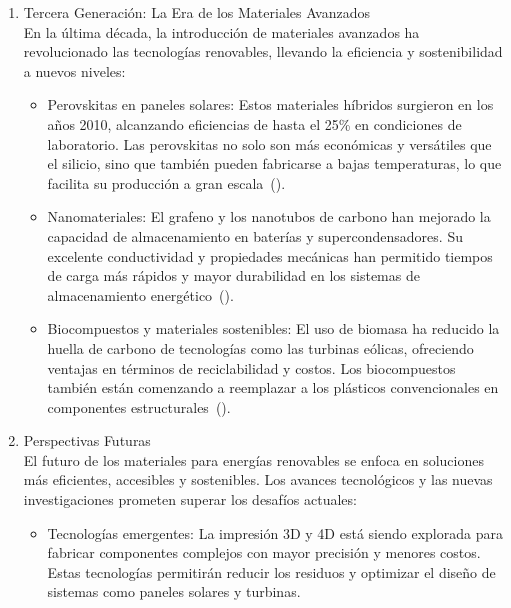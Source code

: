 \documentclass[letterpaper, 12pt]{article}
\begin{document}
\begin{enumerate}
      \item Tercera Generación: La Era de los Materiales Avanzados \\ En la última década,
            la introducción de materiales avanzados ha revolucionado las tecnologías
            renovables, llevando la eficiencia y sostenibilidad a nuevos niveles:

            \begin{itemize}
                  \item Perovskitas en paneles solares: Estos materiales híbridos surgieron en los años
                        2010, alcanzando eficiencias de hasta el 25\% en condiciones de laboratorio.
                        Las perovskitas no solo son más económicas y versátiles que el silicio, sino
                        que también pueden fabricarse a bajas temperaturas, lo que facilita su
                        producción a gran escala~(\cite{Abera2023}).

                  \item Nanomateriales: El grafeno y los nanotubos de carbono han mejorado la capacidad
                        de almacenamiento en baterías y supercondensadores. Su excelente conductividad
                        y propiedades mecánicas han permitido tiempos de carga más rápidos y mayor
                        durabilidad en los sistemas de almacenamiento energético~(\cite{Uyor2021}).

                  \item  Biocompuestos y materiales sostenibles: El uso de biomasa ha reducido la huella
                        de carbono de tecnologías como las turbinas eólicas, ofreciendo ventajas en
                        términos de reciclabilidad y costos. Los biocompuestos también están comenzando
                        a reemplazar a los plásticos convencionales en componentes
                        estructurales~(\cite{Saleh_Hassan2024}).
            \end{itemize}

      \item Perspectivas Futuras \\ El futuro de los materiales para energías renovables se
            enfoca en soluciones más eficientes, accesibles y sostenibles. Los avances
            tecnológicos y las nuevas investigaciones prometen superar los desafíos
            actuales:

            \begin{itemize}
                  \item Tecnologías emergentes: La impresión 3D y 4D está siendo explorada para
                        fabricar componentes complejos con mayor precisión y menores costos. Estas
                        tecnologías permitirán reducir los residuos y optimizar el diseño de sistemas
                        como paneles solares y turbinas.


\end{itemize}
\end{enumerate}
\end{document}
